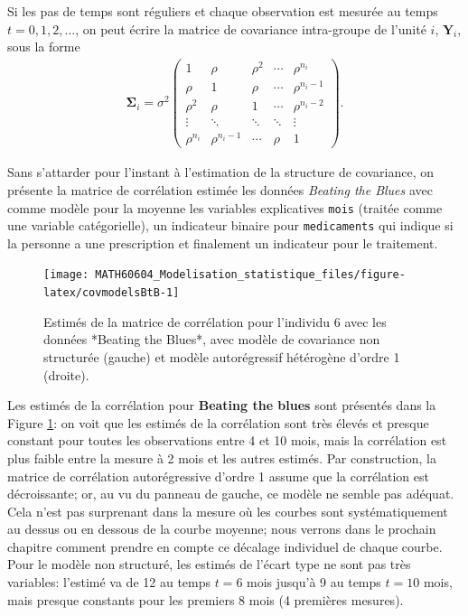 \documentclass[
  11pt,
  letterpaper,
]{article}
\theoremstyle{definition}
\theoremstyle{definition}
\theoremstyle{definition}
\theoremstyle{definition}
\theoremstyle{remark}
\begin{document}
Si les pas de temps sont réguliers et chaque observation est mesurée au temps \(t=0,1,2,\ldots\), on peut écrire la matrice de covariance intra-groupe de l'unité \(i\), \(\boldsymbol{Y}_i\), sous la forme
\begin{align*}
\boldsymbol{\Sigma}_i = \sigma^2   \begin{pmatrix}
   1 & \rho & \rho^2 & \cdots & \rho^{n_i}\\
    \rho & 1 & \rho & \cdots & \rho^{n_i-1}\\
    \rho^2 & \rho & 1 & \cdots & \rho^{n_i-2}\\
  \vdots & \ddots & \ddots & \ddots &  \vdots\\
 \rho^{n_i} &\rho^{n_i-1} & \cdots & \rho & 1
  \end{pmatrix}.
\end{align*}

Sans s'attarder pour l'instant à l'estimation de la structure de covariance, on présente la matrice de corrélation estimée les données \emph{Beating the Blues} avec comme modèle pour la moyenne les variables explicatives \texttt{mois} (traitée comme une variable catégorielle), un indicateur binaire pour \texttt{medicaments} qui indique si la personne a une prescription et finalement un indicateur pour le traitement.

\begin{figure}

{\centering \texttt{[image: MATH60604\_Modelisation\_statistique\_files/figure-latex/covmodelsBtB-1]} 

}

\caption{Estimés de la matrice de corrélation pour l'individu 6 avec les données *Beating the Blues*, avec modèle de covariance non structurée (gauche) et modèle autorégressif hétérogène d'ordre 1 (droite).}\label{fig:covmodelsBtB}
\end{figure}

Les estimés de la corrélation pour \textbf{Beating the blues} sont présentés dans la Figure \ref{fig:covmodelsBtB}: on voit que
les estimés de la corrélation sont très élevés et presque constant pour toutes les observations entre 4 et 10 mois, mais la corrélation est plus faible entre la mesure à 2 mois et les autres estimés. Par construction, la matrice de corrélation autorégressive d'ordre 1 assume que la corrélation est décroissante; or, au vu du panneau de gauche, ce modèle ne semble pas adéquat. Cela n'est pas surprenant dans la mesure où les courbes sont systématiquement au dessus ou en dessous de la courbe moyenne; nous verrons dans le prochain chapitre comment prendre en compte ce décalage individuel de chaque courbe.
Pour le modèle non structuré, les estimés de l'écart type ne sont pas très variables: l'estimé va de 12 au temps \(t=6\) mois jusqu'à 9 au temps \(t=10\) mois, mais presque constants pour les premiers 8 mois (4 premières mesures).
\end{document}
